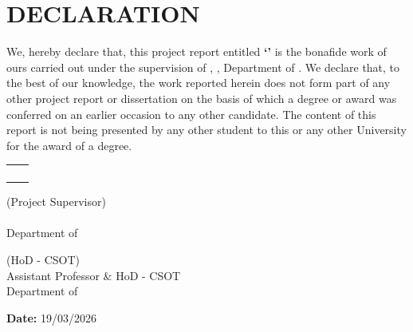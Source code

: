 \chapter*{DECLARATION}
\thispagestyle{bglogo}
	

	
	We, hereby declare that, this project report entitled \textbf{`\thetitle'} is the bonafide work of ours carried out under the supervision of \textbf{\theprojectguide}, \projectguidedesignation, Department of \thedepartment. We declare that, to the best of our knowledge, the work reported herein does not form part of any other project report or dissertation on the basis of which a degree or award was conferred on an earlier occasion to any other candidate. The content of this report is not being presented by any other student to this or any other University for the award of a degree.
	
	\vspace{1cm}
	
	\begin{tabular}{ll}
		\textbf{\studentA} & \regA \\
		\textbf{\studentB} & \regB \\
		\textbf{\studentC} & \regC \\
		\textbf{\studentD} & \regD \\
	\end{tabular}
	
	\vspace{1.5cm}
	
	\noindent\textbf{\theprojectguide} \hfill (Project Supervisor)\\
	\projectguidedesignation\\
	Department of \thedepartment
	
	\vspace{1cm}
	
	\noindent\textbf{\thehod} \hfill (HoD - CSOT)\\
	Assistant Professor \& HoD - CSOT\\
	Department of \thedepartment\\
	\thecollege
	
	\vspace{0.5cm}
	
	\noindent\textbf{Date:} 19/03/2026
	
